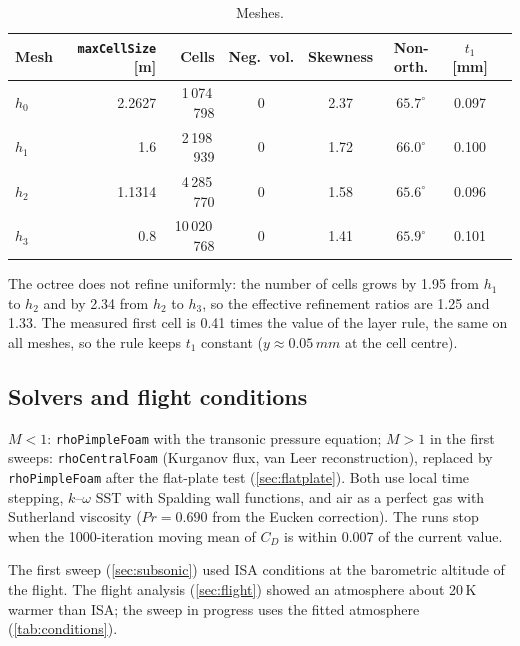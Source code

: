 \documentclass[11pt,a4paper]{article}
\newcommand{\unit}[2]{#1\,#2}
\begin{document}
\begin{table}[htbp]
\centering
\caption{Meshes.}\label{tab:meshes}
\begin{tabular}{@{}lrrccccc@{}}
\toprule
Mesh & \texttt{maxCellSize} [m] & Cells & Neg.\ vol. & Skewness & Non-orth. & $t_1$ [mm] \\
\midrule
$h_0$ & 2.2627 & 1\,074\,798 & 0 & 2.37 & $65.7^\circ$ & 0.097 \\
$h_1$ & 1.6    & 2\,198\,939 & 0 & 1.72 & $66.0^\circ$ & 0.100 \\
$h_2$ & 1.1314 & 4\,285\,770 & 0 & 1.58 & $65.6^\circ$ & 0.096 \\
$h_3$ & 0.8    & 10\,020\,768 & 0 & 1.41 & $65.9^\circ$ & 0.101 \\
\bottomrule
\end{tabular}
\end{table}

The octree does not refine uniformly: the number of cells grows by 1.95 from $h_1$ to
$h_2$ and by 2.34 from $h_2$ to $h_3$, so the effective refinement ratios are 1.25 and
1.33. The measured first cell is 0.41 times the value of the layer rule, the same on all
meshes, so the rule keeps $t_1$ constant ($y \approx \unit{0.05}{mm}$ at the cell
centre).

\subsection{Solvers and flight conditions}

$M < 1$: \texttt{rhoPimpleFoam} with the transonic pressure equation; $M > 1$ in the
first sweeps: \texttt{rhoCentralFoam} (Kurganov flux, van Leer reconstruction), replaced
by \texttt{rhoPimpleFoam} after the flat-plate test (\cref{sec:flatplate}). Both use local time
stepping, $k$--$\omega$ SST with Spalding wall functions, and air as a perfect gas with
Sutherland viscosity ($Pr = 0.690$ from the Eucken correction). The runs stop when the
1000-iteration moving mean of $C_D$ is within 0.007 of the current value.

The first sweep (\cref{sec:subsonic}) used ISA conditions at the barometric altitude of
the flight. The flight analysis (\cref{sec:flight}) showed an atmosphere about
\unit{20}{K} warmer than ISA; the sweep in progress uses the fitted atmosphere
(\cref{tab:conditions}).
\end{document}
